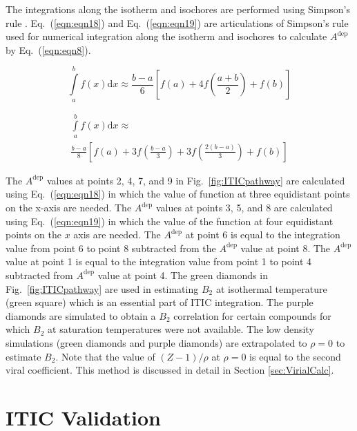 \documentclass[%
 aip,
 jcp,
 sd,%
 amsmath,amssymb,
 reprint,%
]{revtex4-1}
\begin{document}
The integrations along the isotherm and isochores are performed using Simpson's rule \cite{atkinson2008}. Eq.~(\ref{eqn:eqn18}) and Eq.~(\ref{eqn:eqn19}) are
articulations of Simpson's rule used for numerical integration along the isotherm and isochores to calculate $A^{\mathrm{dep}}$ by Eq.~(\ref{eqn:eqn8}).

\begin{equation}
\int\limits_a^b {f(x)\mathrm{d} x \approx \frac{{b - a}}{6}} \left[ {f(a) + 4f \left( \frac{{a + b}}{2} \right) + f(b)} \right] \label{eqn:eqn18}
\end{equation}

\begin{equation}
\begin{array}{l}
{\int\limits_a^b f(x)\mathrm{d}x \approx }
\\ 
{{\frac{{b - a}}{8} \left[ {f(a) + 3f \left( \frac{{b - a}}{3} \right) + 3f \left( \frac{{2(b - a)}}{3} \right) + f(b)} \right]}}  
\end{array}
\label{eqn:eqn19}
\end{equation}

The $A^{\mathrm{dep}}$ values at points 2, 4, 7, and 9 in Fig.~\ref{fig:ITICpathway} are calculated using Eq.~(\ref{eqn:eqn18}) in which the value of function at three equidistant points on the x-axis are needed. The $A^{\mathrm{dep}}$ values at points 3, 5, and 8 are calculated using Eq.~(\ref{eqn:eqn19}) in which the value of the function at four equidistant points on the $x$ axis are needed. The $A^{\mathrm{dep}}$ at point 6 is equal to the integration value from point 6 to point 8 subtracted from the $A^{\mathrm{dep}}$ value at point 8. The $A^{\mathrm{dep}}$ value at point 1 is equal to the integration value from point 1 to point 4 subtracted from $A^{\mathrm{dep}}$ value at point 4. The green diamonds in Fig.~\ref{fig:ITICpathway} are used in estimating $B_2$ at isothermal temperature (green square) which is an essential part of ITIC integration. The purple diamonds are simulated to obtain a $B_2$ correlation for certain compounds for which $B_2$ at saturation temperatures were not available. The low density simulations (green diamonds and purple diamonds) are extrapolated to $\rho=0$ to estimate $B_2$. Note that the value of $(Z-1)/\rho$ at $\rho=0$ is equal to the second viral coefficient. This method is discussed in detail in Section \ref{sec:VirialCalc}. 
\section{ITIC Validation}
\end{document}
